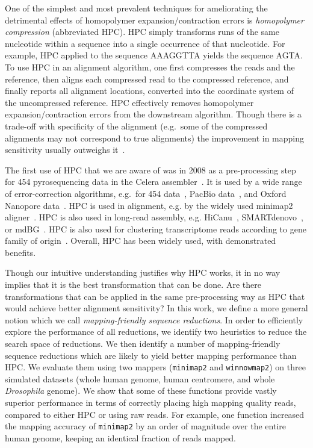 \documentclass[
  11,
]{scrbook}
\begin{document}
One of the simplest and most prevalent techniques for ameliorating the
detrimental effects of homopolymer expansion/contraction errors is
\emph{homopolymer compression} (abbreviated HPC). HPC simply transforms runs
of the same nucleotide within a sequence into a single occurrence of
that nucleotide. For example, HPC applied to the sequence AAAGGTTA
yields the sequence AGTA. To use HPC in an alignment algorithm, one
first compresses the reads and the reference, then aligns each
compressed read to the compressed reference, and finally reports all
alignment locations, converted into the coordinate system of the
uncompressed reference. HPC effectively removes homopolymer
expansion/contraction errors from the downstream algorithm. Though there
is a trade-off with specificity of the alignment (e.g.~some of the
compressed alignments may not correspond to true alignments) the
improvement in mapping sensitivity usually outweighs
it~\autocite{liMinimap2PairwiseAlignment2018}.

The first use of HPC that we are aware of was in 2008 as a
pre-processing step for 454 pyrosequencing data in the Celera
assembler~\textcite{millerAggressiveAssemblyPyrosequencing2008}. It is used by a
wide range of error-correction algorithms, e.g.~for 454
data~\autocite{braggFastAccurateErrorcorrection2012}, PacBio
data~\autocite{auImprovingPacBioLong2012}, and Oxford Nanopore
data~\autocite{sahlinErrorCorrectionEnables2021}. HPC is used in alignment, e.g.
by the widely used minimap2 aligner~\autocite{liMinimap2PairwiseAlignment2018}.
HPC is also used in long-read assembly, e.g.
HiCanu~\autocite{nurkHiCanuAccurateAssembly2020},
SMARTdenovo~\autocite{liuSMARTdenovoNovoAssembler2021}, or
mdBG~\autocite{ekimMinimizerspaceBruijnGraphs2021}. HPC is also used for
clustering transcriptome reads according to gene family of
origin~\autocite{sahlinNovoClusteringLongRead2020}. Overall, HPC has been widely
used, with demonstrated benefits.

Though our intuitive understanding justifies why HPC works, it in no way
implies that it is the best transformation that can be done. Are there
transformations that can be applied in the same pre-processing way as
HPC that would achieve better alignment sensitivity? In this work, we
define a more general notion which we call \emph{mapping-friendly sequence
reductions}. In order to efficiently explore the performance of all
reductions, we identify two heuristics to reduce the search space of
reductions. We then identify a number of mapping-friendly sequence
reductions which are likely to yield better mapping performance than
HPC. We evaluate them using two mappers (\texttt{minimap2} and \texttt{winnowmap2}) on
three simulated datasets (whole human genome, human centromere, and
whole \emph{Drosophila} genome). We show that some of these functions provide
vastly superior performance in terms of correctly placing high mapping
quality reads, compared to either HPC or using raw reads. For example,
one function increased the mapping accuracy of \texttt{minimap2} by an order of
magnitude over the entire human genome, keeping an identical fraction of
reads mapped.
\end{document}
